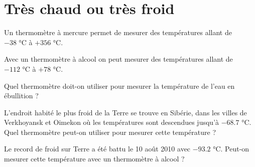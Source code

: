 \section{Très chaud ou très froid}

Un thermomètre à mercure permet de mesurer des températures allant de \\ \noindent $-38$ °C à  $+356$ °C.

Avec un thermomètre à alcool on peut mesurer des températures allant de \\ \noindent $-112$ °C à  $+78$ °C.

\begin{questions}
	\question Quel thermomètre doit-on utiliser pour mesurer la température de l'eau en ébullition ?
	
	\question L'endroit habité le plus froid de la Terre se trouve en Sibérie, dans les villes de Verkhoyansk et Oimekon où les températures sont descendues jusqu'à $\num{-68.7}$ °C. Quel thermomètre peut-on utiliser pour mesurer cette température ?
	
	\question Le record de froid sur Terre a été battu le 10 août 2010 avec $\num{-93.2}$ °C. Peut-on mesurer cette température avec un thermomètre à alcool ?
\end{questions}